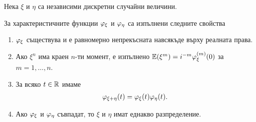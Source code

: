 \documentclass[numbers=endperiod, bibliography=totocnumbered]{scrartcl}
\begin{document}
\begin{theorem}\label{thm:char_properties}
  Нека \( \xi \) и \( \eta \) са независими дискретни случайни величини.

  За характеристичните функции \( \varphi_\xi \) и \( \varphi_\eta \) са изпълнени следните свойства
  \begin{enumerate}
    \item \( \varphi_\xi \) съществува и е равномерно непрекъсната навсякъде върху реалната права.

    \item Ако \( \xi^n \) има краен \( n \)-ти момент, е изпълнено \( \mathbb{E}(\xi^m) = i^{-m} \varphi_\xi^{(m)} (0) \) за \( m = 1, \ldots, n \).

    \item За всяко \( t \in \mathbb{R} \) имаме
    \begin{align*}
      \varphi_{\xi + \eta}(t) = \varphi_\xi(t) \varphi_\eta(t).
    \end{align*}

    \item Ако \( \varphi_\xi \) и \( \varphi_\eta \) съвпадат, то \( \xi \) и \( \eta \) имат еднакво разпределение.
  \end{enumerate}
\end{theorem}
\end{document}
